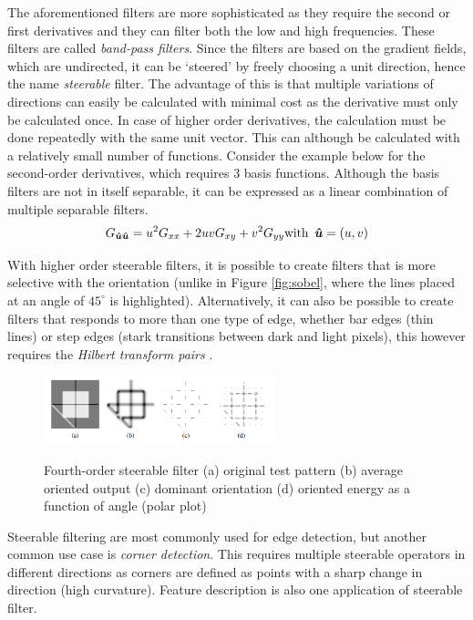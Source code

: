 \documentclass[twoside,a4paper,article]{combine}
\begin{document}
The aforementioned filters are more sophisticated as they require the second or first derivatives and they can filter both the low and high frequencies. 
These filters are called \emph{band-pass filters}.
Since the filters are based on the gradient fields, which are undirected, it can be `steered' by freely choosing a unit direction, hence the name
\emph{steerable} filter. The advantage of this is that multiple variations of directions can easily be calculated with minimal cost as the derivative must only be calculated once. In case of higher order derivatives,
the calculation must be done repeatedly with the same unit vector. This can although be calculated with a relatively small number of functions\cite{Szeliski_2022}. Consider the example below for the second-order derivatives,
which requires 3 basis functions. Although the basis filters are not in itself separable, it can be expressed as a linear combination of multiple separable filters.
\[
    G_{\boldsymbol{\hat{u}}\boldsymbol{\hat{u}}} = u^2 G_{xx} + 2uvG_{xy} + v^2 G_{yy} \text{with} \hspace*{0.5em}\boldsymbol{\hat{u}} = (u, v)
\]

With higher order steerable filters, it is possible to create filters that is more selective with the orientation (unlike in Figure \ref{fig:sobel}, where the lines placed at an angle of $45^\circ$ is highlighted). Alternatively,
it can also be possible to create filters that responds to more than one type of edge, whether bar edges (thin lines) or step edges (stark transitions between dark and light pixels), this however requires the \emph{Hilbert transform pairs}
\cite{Szeliski_2022}.

\begin{minipage}{\textwidth}\begin{figure}[H]
    \centering\includegraphics[width=0.60\textwidth]{img/higher.PNG}
    \caption{Fourth-order steerable filter (a) original test pattern (b) average oriented output (c) dominant orientation (d) oriented energy as a function of angle (polar plot)}\cite{Szeliski_2022}
\end{figure}\end{minipage}

Steerable filtering are most commonly used for edge detection, but another common use case is \emph{corner detection}. This requires multiple steerable operators in different directions as corners are defined as
points with a sharp change in direction (high curvature)\cite{NIXON2020141}. Feature description is also one application of steerable filter\cite{Szeliski_2022}.
\end{document}
